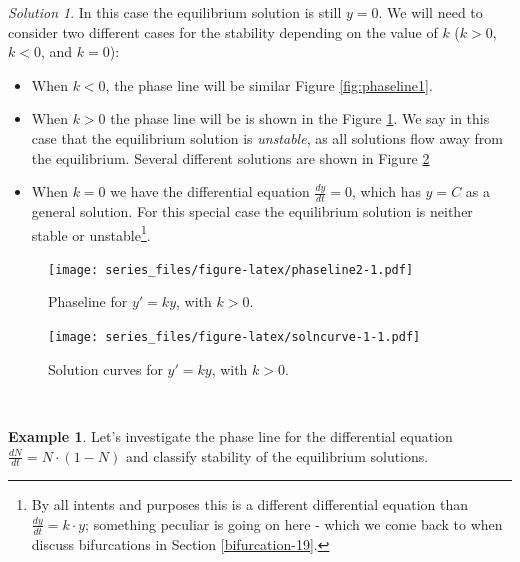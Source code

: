 \documentclass[
]{book}
\providecommand{\tightlist}{%
  \setlength{\itemsep}{0pt}\setlength{\parskip}{0pt}}
\theoremstyle{definition}
\theoremstyle{definition}
\newtheorem{example}{Example}[chapter]
\theoremstyle{definition}
\theoremstyle{remark}
\newtheorem*{solution}{Solution}
\begin{document}
\begin{solution}
{}In this case the equilibrium solution is still \(y=0\). We will need to consider two different cases for the stability depending on the value of \(k\) (\(k>0\), \(k<0\), and \(k=0\)):

\begin{itemize}
\tightlist
\item
  When \(k<0\), the phase line will be similar Figure \ref{fig:phaseline1}.
\item
  When \(k>0\) the phase line will be is shown in the Figure \ref{fig:phaseline2}. We say in this case that the equilibrium solution is \emph{unstable}, as all solutions flow away from the equilibrium. Several different solutions are shown in Figure \ref{fig:solncurve-1}
\item
  When \(k=0\) we have the differential equation \(\displaystyle \frac{dy}{dt}=0\), which has \(y=C\) as a general solution. For this special case the equilibrium solution is neither stable or unstable\footnote{By all intents and purposes this is a different differential equation than \(\displaystyle \frac{dy}{dt}=k\cdot y\); something peculiar is going on here - which we come back to when discuss bifurcations in Section \ref{bifurcation-19}.}.
\end{itemize}
\end{solution}

\begin{figure}
\centering
\texttt{[image: series\_files/figure-latex/phaseline2-1.pdf]}
\caption{\label{fig:phaseline2}Phaseline for \(y'=ky\), with \(k>0\).}
\end{figure}

\begin{figure}
\centering
\texttt{[image: series\_files/figure-latex/solncurve-1-1.pdf]}
\caption{\label{fig:solncurve-1}Solution curves for \(y'=ky\), with \(k>0\).}
\end{figure}

~

\begin{example}
\protect\hypertarget{exm:unnamed-chunk-83}{}{\label{exm:unnamed-chunk-83} }Let's investigate the phase line for the differential equation \(\displaystyle \frac{dN}{dt} = N \cdot(1-N)\) and classify stability of the equilibrium solutions.
\end{example}
\end{document}
